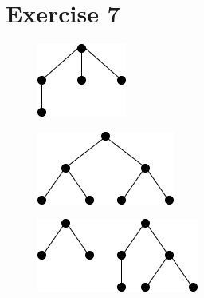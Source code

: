 \documentclass{article}
\begin{document}
\section{Exercise 7}
    \begin{figure}[H]
        \centering
        \begin{minipage}[b]{0.2\textwidth}
            \includegraphics[width=\textwidth]{10.1.png}
            \subcaption{}
            \label{fig:figure-7-1}
        \end{minipage}
        \hfill
        \begin{minipage}[b]{0.3\textwidth}
            \includegraphics[width=\textwidth]{10.2.png}
            \subcaption{}
            \label{fig:figure-7-2}
        \end{minipage}
        \hfill
        \begin{minipage}[b]{0.4\textwidth}
            \includegraphics[width=\textwidth]{10.3.png}

\end{minipage}
\end{figure}
\end{document}
